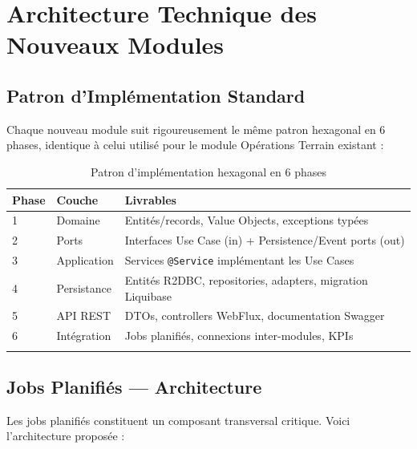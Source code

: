 \documentclass[12pt,a4paper]{report}
\begin{document}
\chapter{Architecture Technique des Nouveaux Modules}

\section{Patron d'Implémentation Standard}

Chaque nouveau module suit rigoureusement le même patron hexagonal en 6 phases, identique à celui utilisé pour le module Opérations Terrain existant :

\begin{longtable}{p{1cm}p{3cm}p{9cm}}
\toprule
\textbf{Phase} & \textbf{Couche} & \textbf{Livrables} \\
\midrule
\endhead
1 & Domaine & Entités/records, Value Objects, exceptions typées \\
2 & Ports & Interfaces Use Case (in) + Persistence/Event ports (out) \\
3 & Application & Services \texttt{@Service} implémentant les Use Cases \\
4 & Persistance & Entités R2DBC, repositories, adapters, migration Liquibase \\
5 & API REST & DTOs, controllers WebFlux, documentation Swagger \\
6 & Intégration & Jobs planifiés, connexions inter-modules, KPIs \\
\bottomrule
\caption{Patron d'implémentation hexagonal en 6 phases}
\end{longtable}

\section{Jobs Planifiés — Architecture}

Les jobs planifiés constituent un composant transversal critique. Voici l'architecture proposée :
\end{document}
